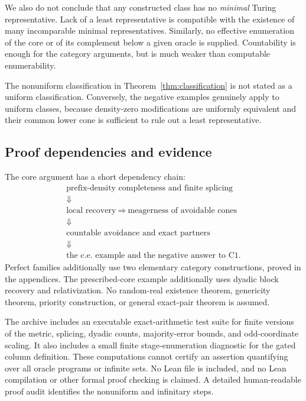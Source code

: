 \documentclass[11pt,a4paper]{article}
\theoremstyle{definition}\newtheorem{definition}[theorem]{Definition}
\theoremstyle{remark}\newtheorem{remark}[theorem]{Remark}
\begin{document}
We also do not conclude that any constructed class has no \emph{minimal} Turing representative. Lack of a least representative is compatible with the existence of many incomparable minimal representatives. Similarly, no effective enumeration of the core or of its complement below a given oracle is supplied. Countability is enough for the category arguments, but is much weaker than computable enumerability.

The nonuniform classification in Theorem~\ref{thm:classification} is not stated as a uniform classification. Conversely, the negative examples genuinely apply to uniform classes, because density-zero modifications are uniformly equivalent and their common lower cone is sufficient to rule out a least representative.

\subsection{Proof dependencies and evidence}
The core argument has a short dependency chain:
\[
 \begin{gathered}
 \text{prefix-density completeness and finite splicing}\\
 \Downarrow\\
 \text{local recovery}\ \Longrightarrow\ \text{meagerness of avoidable cones}\\
 \Downarrow\\
 \text{countable avoidance and exact partners}\\
 \Downarrow\\
 \text{the c.e. example and the negative answer to C1}.
 \end{gathered}
\]
Perfect families additionally use two elementary category constructions, proved in the appendices. The prescribed-core example additionally uses dyadic block recovery and relativization. No random-real existence theorem, genericity theorem, priority construction, or general exact-pair theorem is assumed.

The archive includes an executable exact-arithmetic test suite for finite versions of the metric, splicing, dyadic counts, majority-error bounds, and odd-coordinate scaling. It also includes a small finite stage-enumeration diagnostic for the gated column definition. These computations cannot certify an assertion quantifying over all oracle programs or infinite sets. No Lean file is included, and no Lean compilation or other formal proof checking is claimed. A detailed human-readable proof audit identifies the nonuniform and infinitary steps.
\end{document}
